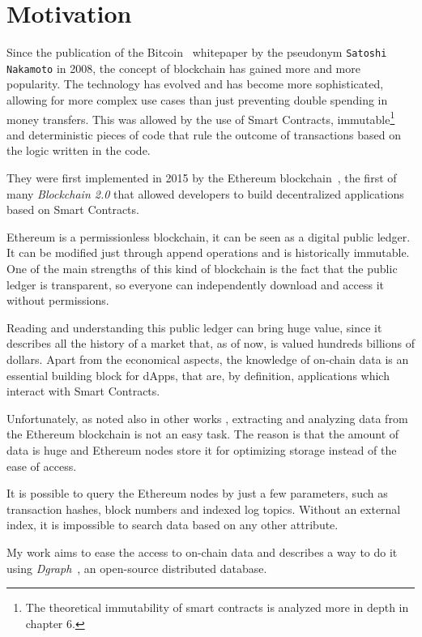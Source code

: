 
\section{Motivation}

Since the publication of the Bitcoin~\cite{bitcoin} whitepaper by the pseudonym {\tt Satoshi Nakamoto} in 2008, the concept of blockchain has gained more and more popularity. The technology has evolved and has become more sophisticated, allowing for more complex use cases than just preventing double spending in money transfers. This was allowed by the use of Smart Contracts, immutable\footnote{The theoretical immutability of smart contracts is analyzed more in depth in chapter 6.} and deterministic pieces of code that rule the outcome of transactions based on the logic written in the code.

They were first implemented in 2015 by the Ethereum blockchain~\cite{Ethereum}, the first of many \textit{Blockchain 2.0} that allowed developers to build decentralized applications based on Smart Contracts. 

Ethereum is a permissionless blockchain, it can be seen as a digital public ledger. It can be modified just through append operations and is historically immutable. One of the main strengths of this kind of blockchain is the fact that the public ledger is transparent, so everyone can independently download and access it without permissions.

Reading and understanding this public ledger can bring huge value, since it describes all the history of a market that, as of now, is valued hundreds billions of dollars. Apart from the economical aspects, the knowledge of on-chain data is an essential building block for dApps, that are, by definition, applications which interact with Smart Contracts.

Unfortunately, as noted also in other works \cite{dataether,xblock-eth,ethereum_query_language}, extracting and analyzing data from the Ethereum blockchain is not an easy task. The reason is that the amount of data is huge and Ethereum nodes store it for optimizing storage instead of the ease of access. 

It is possible to query the Ethereum nodes by just a few parameters, such as transaction hashes, block numbers and indexed log topics. 
Without an external index, it is impossible to search data based on any other attribute.

My work aims to ease the access to on-chain data and describes a way to do it using \textit{Dgraph}~\cite{dgraph}, an open-source distributed database.

